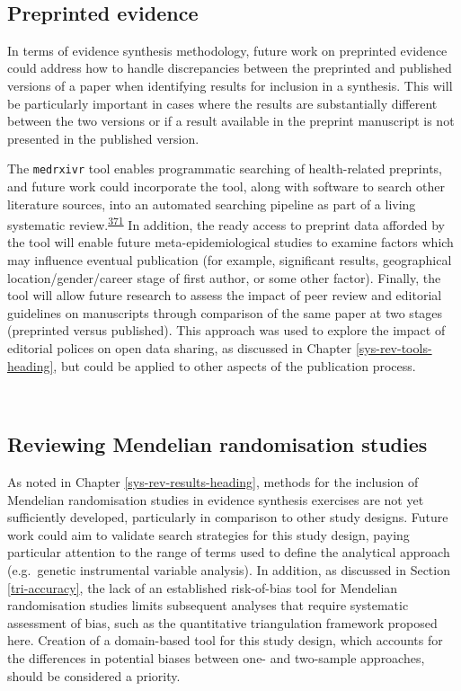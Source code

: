 \documentclass[a4paper, twoside]{templates/ociamthesis}
\begin{document}
~

\hypertarget{preprinted-evidence}{%
\subsection{Preprinted evidence}\label{preprinted-evidence}}

In terms of evidence synthesis methodology, future work on preprinted evidence could address how to handle discrepancies between the preprinted and published versions of a paper when identifying results for inclusion in a synthesis. This will be particularly important in cases where the results are substantially different between the two versions or if a result available in the preprint manuscript is not presented in the published version.

The \texttt{medrxivr} tool enables programmatic searching of health-related preprints, and future work could incorporate the tool, along with software to search other literature sources, into an automated searching pipeline as part of a living systematic review.\textsuperscript{\protect\hyperlink{ref-elliott2014}{371}} In addition, the ready access to preprint data afforded by the tool will enable future meta-epidemiological studies to examine factors which may influence eventual publication (for example, significant results, geographical location/gender/career stage of first author, or some other factor). Finally, the tool will allow future research to assess the impact of peer review and editorial guidelines on manuscripts through comparison of the same paper at two stages (preprinted versus published). This approach was used to explore the impact of editorial polices on open data sharing, as discussed in Chapter \ref{sys-rev-tools-heading}, but could be applied to other aspects of the publication process.

~

\hypertarget{reviewing-mendelian-randomisation-studies}{%
\subsection{Reviewing Mendelian randomisation studies}\label{reviewing-mendelian-randomisation-studies}}

As noted in Chapter \ref{sys-rev-results-heading}, methods for the inclusion of Mendelian randomisation studies in evidence synthesis exercises are not yet sufficiently developed, particularly in comparison to other study designs. Future work could aim to validate search strategies for this study design, paying particular attention to the range of terms used to define the analytical approach (e.g.~genetic instrumental variable analysis). In addition, as discussed in Section \ref{tri-accuracy}, the lack of an established risk-of-bias tool for Mendelian randomisation studies limits subsequent analyses that require systematic assessment of bias, such as the quantitative triangulation framework proposed here. Creation of a domain-based tool for this study design, which accounts for the differences in potential biases between one- and two-sample approaches, should be considered a priority.
\end{document}
